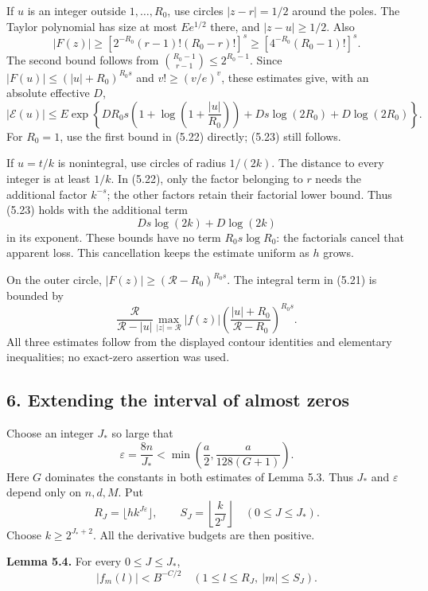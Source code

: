 \documentclass[
  11pt,
  a4paper,
]{article}
\begin{document}
If \(u\) is an integer outside \(1,\ldots,R_0\), use circles
\(|z-r|=1/2\) around the poles. The Taylor polynomial has size at most
\(Ee^{1/2}\) there, and \(|z-u|\ge1/2\). Also \[
|F(z)|\ge
\left[2^{-R_0}(r-1)!(R_0-r)!\right]^s
\ge\left[4^{-R_0}(R_0-1)!\right]^s. \tag{5.22}
\] The second bound follows from \(\binom{R_0-1}{r-1}\le2^{R_0-1}\).
Since \(|F(u)|\le(|u|+R_0)^{R_0s}\) and \(v!\ge(v/e)^v\), these
estimates give, with an absolute effective \(D\), \[
|\mathcal E(u)|\le
E\exp\left\{
DR_0s\left(1+\log\left(1+\frac{|u|}{R_0}\right)\right)
+Ds\log(2R_0)+D\log(2R_0)\right\}. \tag{5.23}
\] For \(R_0=1\), use the first bound in (5.22) directly; (5.23) still
follows.

If \(u=t/k\) is nonintegral, use circles of radius \(1/(2k)\). The
distance to every integer is at least \(1/k\). In (5.22), only the
factor belonging to \(r\) needs the additional factor \(k^{-s}\); the
other factors retain their factorial lower bound. Thus (5.23) holds with
the additional term \[
Ds\log(2k)+D\log(2k) \tag{5.24}
\] in its exponent. These bounds have no term \(R_0s\log R_0\): the
factorials cancel that apparent loss. This cancellation keeps the
estimate uniform as \(h\) grows.

On the outer circle, \(|F(z)|\ge(\mathcal R-R_0)^{R_0s}\). The integral
term in (5.21) is bounded by \[
\frac{\mathcal R}{\mathcal R-|u|}
\max_{|z|=\mathcal R}|f(z)|
\left(\frac{|u|+R_0}{\mathcal R-R_0}\right)^{R_0s}. \tag{5.25}
\] All three estimates follow from the displayed contour identities and
elementary inequalities; no exact-zero assertion was used.

\subsection{6. Extending the interval of almost
zeros}\label{extending-the-interval-of-almost-zeros}

Choose an integer \(J_*\) so large that \[
\varepsilon=\frac{8n}{J_*}
<\min\left(\frac a2,\frac{a}{128(G+1)}\right). \tag{5.26}
\] Here \(G\) dominates the constants in both estimates of Lemma 5.3.
Thus \(J_*\) and \(\varepsilon\) depend only on \(n,d,M\). Put \[
R_J=\lfloor hk^{J\varepsilon}\rfloor,\qquad
S_J=\left\lfloor\frac{k}{2^J}\right\rfloor
\quad(0\le J\le J_*).
\] Choose \(k\ge2^{J_*+2}\). All the derivative budgets are then
positive.

\textbf{Lemma 5.4.} For every \(0\le J\le J_*\), \[
|f_m(l)|<B^{-C/2}
\quad(1\le l\le R_J,\ |m|\le S_J). \tag{5.27}
\]
\end{document}
